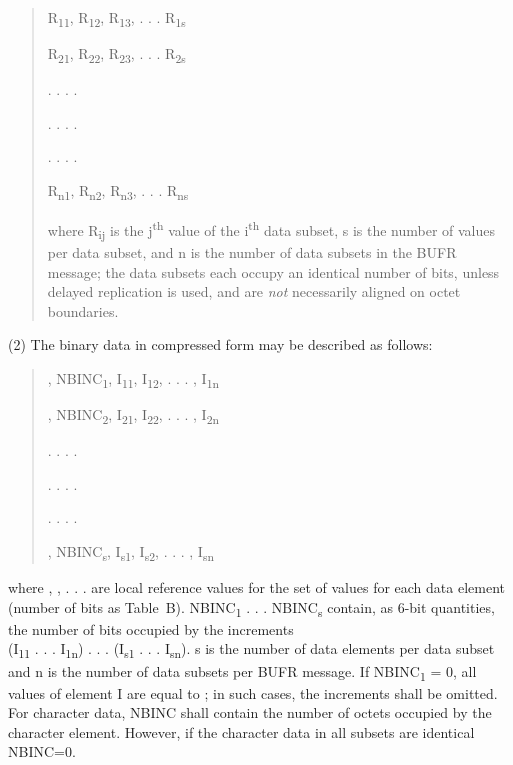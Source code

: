 \begin{quote}
R\textsubscript{11}, R\textsubscript{12}, R\textsubscript{13}, . . . R\textsubscript{1s}

R\textsubscript{21}, R\textsubscript{22}, R\textsubscript{23}, . . . R\textsubscript{2s}

. . . .

. . . .

. . . .

R\textsubscript{n1}, R\textsubscript{n2}, R\textsubscript{n3}, . . . R\textsubscript{ns}

where R\textsubscript{ij} is the j\textsuperscript{th} value of the i\textsuperscript{th} data subset, s is the number of values per data subset, and n is the number of data subsets in the BUFR message; the data subsets each occupy an identical number of bits, unless delayed replication is used, and are \emph{not} necessarily aligned on octet boundaries.
\end{quote}

(2) The binary data in compressed form may be described as follows:

\begin{quote}
, NBINC\textsubscript{1}, I\textsubscript{11}, I\textsubscript{12}, . . . , I\textsubscript{1n}

, NBINC\textsubscript{2}, I\textsubscript{21}, I\textsubscript{22}, . . . , I\textsubscript{2n}

. . . .

. . . .

. . . .

, NBINC\textsubscript{s}, I\textsubscript{s1}, I\textsubscript{s2}, . . . , I\textsubscript{sn}
\end{quote}

where , , . . . are local reference values for the set of values for each data element (number of bits as Table~B). NBINC\textsubscript{1} . . . NBINC\textsubscript{s} contain, as 6-bit quantities, the number of bits occupied by the increments\\
(I\textsubscript{11} . . . I\textsubscript{1n}) . . . (I\textsubscript{s1} . . . I\textsubscript{sn}). s is the number of data elements per data subset and n is the number of data subsets per BUFR message. If NBINC\textsubscript{1} = 0, all values of element I are equal to ; in such cases, the increments shall be omitted. For character data, NBINC shall contain the number of octets occupied by the character element. However, if the character data in all subsets are identical NBINC=0.

